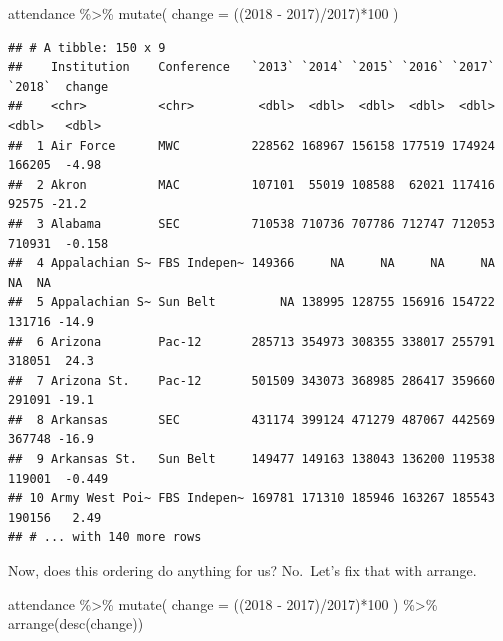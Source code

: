 \documentclass[
]{book}
\newenvironment{Shaded}{\begin{snugshade}}{\end{snugshade}}
\newcommand{\AttributeTok}[1]{\textcolor[rgb]{0.77,0.63,0.00}{#1}}
\newcommand{\DecValTok}[1]{\textcolor[rgb]{0.00,0.00,0.81}{#1}}
\newcommand{\FunctionTok}[1]{\textcolor[rgb]{0.00,0.00,0.00}{#1}}
\newcommand{\NormalTok}[1]{#1}
\newcommand{\SpecialCharTok}[1]{\textcolor[rgb]{0.00,0.00,0.00}{#1}}
\newcommand{\StringTok}[1]{\textcolor[rgb]{0.31,0.60,0.02}{#1}}
\begin{document}
\begin{Shaded}
\begin{Highlighting}[]
\NormalTok{attendance }\SpecialCharTok{\%\textgreater{}\%} \FunctionTok{mutate}\NormalTok{(}
  \AttributeTok{change =}\NormalTok{ ((}\StringTok{\textasciigrave{}}\AttributeTok{2018}\StringTok{\textasciigrave{}} \SpecialCharTok{{-}} \StringTok{\textasciigrave{}}\AttributeTok{2017}\StringTok{\textasciigrave{}}\NormalTok{)}\SpecialCharTok{/}\StringTok{\textasciigrave{}}\AttributeTok{2017}\StringTok{\textasciigrave{}}\NormalTok{)}\SpecialCharTok{*}\DecValTok{100}
\NormalTok{) }
\end{Highlighting}
\end{Shaded}

\begin{verbatim}
## # A tibble: 150 x 9
##    Institution    Conference   `2013` `2014` `2015` `2016` `2017` `2018`  change
##    <chr>          <chr>         <dbl>  <dbl>  <dbl>  <dbl>  <dbl>  <dbl>   <dbl>
##  1 Air Force      MWC          228562 168967 156158 177519 174924 166205  -4.98 
##  2 Akron          MAC          107101  55019 108588  62021 117416  92575 -21.2  
##  3 Alabama        SEC          710538 710736 707786 712747 712053 710931  -0.158
##  4 Appalachian S~ FBS Indepen~ 149366     NA     NA     NA     NA     NA  NA    
##  5 Appalachian S~ Sun Belt         NA 138995 128755 156916 154722 131716 -14.9  
##  6 Arizona        Pac-12       285713 354973 308355 338017 255791 318051  24.3  
##  7 Arizona St.    Pac-12       501509 343073 368985 286417 359660 291091 -19.1  
##  8 Arkansas       SEC          431174 399124 471279 487067 442569 367748 -16.9  
##  9 Arkansas St.   Sun Belt     149477 149163 138043 136200 119538 119001  -0.449
## 10 Army West Poi~ FBS Indepen~ 169781 171310 185946 163267 185543 190156   2.49 
## # ... with 140 more rows
\end{verbatim}

Now, does this ordering do anything for us? No.~Let's fix that with arrange.

\begin{Shaded}
\begin{Highlighting}[]
\NormalTok{attendance }\SpecialCharTok{\%\textgreater{}\%} \FunctionTok{mutate}\NormalTok{(}
  \AttributeTok{change =}\NormalTok{ ((}\StringTok{\textasciigrave{}}\AttributeTok{2018}\StringTok{\textasciigrave{}} \SpecialCharTok{{-}} \StringTok{\textasciigrave{}}\AttributeTok{2017}\StringTok{\textasciigrave{}}\NormalTok{)}\SpecialCharTok{/}\StringTok{\textasciigrave{}}\AttributeTok{2017}\StringTok{\textasciigrave{}}\NormalTok{)}\SpecialCharTok{*}\DecValTok{100}
\NormalTok{) }\SpecialCharTok{\%\textgreater{}\%} \FunctionTok{arrange}\NormalTok{(}\FunctionTok{desc}\NormalTok{(change))}
\end{Highlighting}
\end{Shaded}
\end{document}
